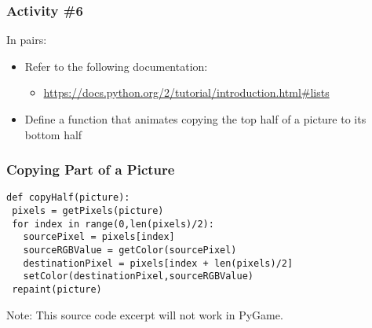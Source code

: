 \begin{frame}
	\frametitle{Activity \#6}
	
	In pairs:
	
	\vspace{2em}
	
	\begin{itemize}
		\item Refer to the following documentation:
		\begin{itemize}
			\item \url{https://docs.python.org/2/tutorial/introduction.html\#lists}
		\end{itemize}
		\item Define a function that animates copying the top half of a picture to its bottom half
	\end{itemize}
\end{frame}

\begin{frame}[fragile]
	\frametitle{Copying Part of a Picture}

\begin{lstlisting}
def copyHalf(picture):
 pixels = getPixels(picture)
 for index in range(0,len(pixels)/2):
   sourcePixel = pixels[index]
   sourceRGBValue = getColor(sourcePixel)
   destinationPixel = pixels[index + len(pixels)/2]
   setColor(destinationPixel,sourceRGBValue)
 repaint(picture)
\end{lstlisting}

Note: This source code excerpt will not work in PyGame.

\end{frame}



